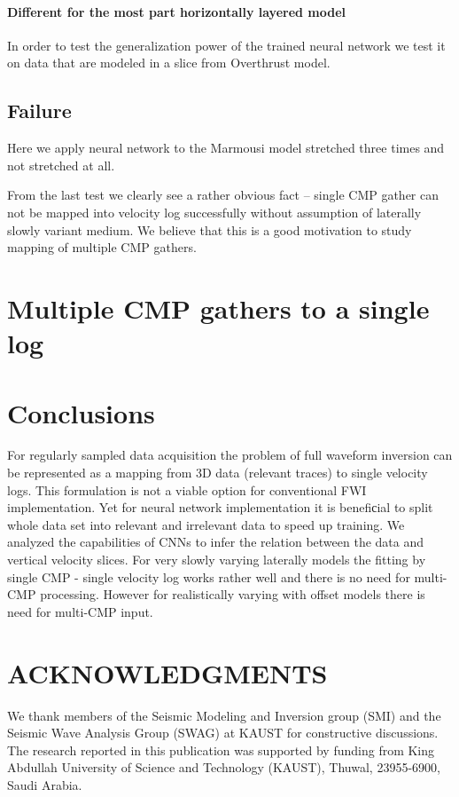 \documentclass[paper,twocolomn]{geophysics}
\begin{document}
\paragraph{Different for the most part horizontally layered model}
In order to test the generalization power of the trained neural network we test it on data that are modeled in a slice from Overthrust model.


\subsection{Failure}
Here we apply neural network to the Marmousi model stretched three times and not stretched at all.

From the last test we clearly see a rather obvious fact -- single CMP gather can not be mapped into velocity log successfully without assumption of laterally slowly variant medium. We believe that this is a good motivation to study mapping of multiple CMP gathers.

\section{Multiple CMP gathers to a single log}

\section{Conclusions}
For regularly sampled data acquisition the problem of full waveform inversion can be represented as a mapping from 3D data (relevant traces) to single velocity logs. This formulation is not a viable option for conventional FWI implementation. Yet for neural network implementation it is benefiсial to split whole data set into relevant and irrelevant data to speed up training.  
We analyzed the capabilities of CNNs to infer the relation between the data and vertical velocity slices. For very slowly varying laterally models the fitting by single CMP - single velocity log works rather well and there is no need for multi-CMP processing. However for realistically varying with offset models there is need for multi-CMP input. 


\section{ACKNOWLEDGMENTS}

We thank members of the Seismic Modeling and Inversion group (SMI) and the Seismic Wave Analysis Group (SWAG) at KAUST for constructive discussions.
The research reported in this publication was supported by funding from King Abdullah University of Science and Technology (KAUST), Thuwal, 23955-6900, Saudi Arabia.




\newpage


\end{document}

